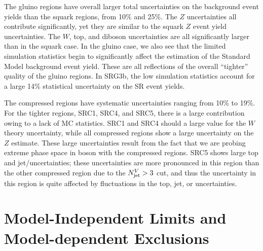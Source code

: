 The gluino regions have overall larger total uncertainties on the background event yields than the squark regions, from 10\% and 25\%.
The $Z$ uncertainties all contribute significantly, yet they are similar to the squark $Z$ event yield uncertainties.
The $W$, top, and diboson uncertainties are all significantly larger than in the squark case.
In the gluino case, we also see that the limited simulation statistics begin to significantly affect the estimation of the Standard Model background event yield.
These are all reflections of the overall ``tighter'' quality of the gluino regions.
In SRG3b, the low simulation statistics account for a large 14\% statistical uncertainty on the SR event yields.

The compressed regions have systematic uncertainties ranging from 10\% to 19\%.
For the tighter regions, SRC1, SRC4, and SRC5, there is a large contribution owing to a lack of MC statistics.
SRC1 and SRC4 should a large value for the $W$ theory uncertainty, while all compressed regions show a large uncertainty on the $Z$ estimate.
These large uncertainties result from the fact that we are probing extreme phase space in boson \pt with the compressed regions.
SRC5 shows large top and jet/\met uncertainties; these uncertainties are more pronounced in this region than the other compressed region due to the $N_{\text{jet}}^V > 3$ cut, and thus the uncertainty in this region is quite affected by fluctuations in the top, jet, or \met uncertainties.




\section{Model-Independent Limits and Model-dependent Exclusions}

